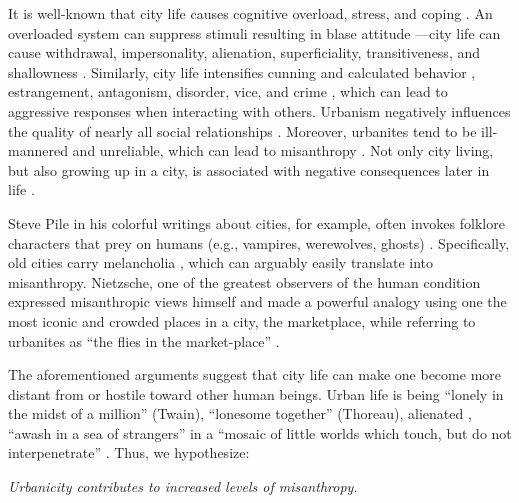\documentclass[11pt, letterpaper]{article}
\begin{document}
\begin{spacing}{1.4}
It is well-known that city life causes cognitive overload, stress, and coping \citep{simmel03, milgram70,lederbogen11}. An overloaded system can suppress stimuli resulting in blase attitude
\citep{simmel03}---city life can cause withdrawal, impersonality, alienation, superficiality, transitiveness, and shallowness \citep{wirth38}. Similarly, city life intensifies cunning and calculated behavior \citep{tonnies57}, estrangement, antagonism, disorder, vice, and crime
\citep{milgram70,park15,park84,bettencourt10b}, which can lead to aggressive
responses when interacting with others.
%
Urbanism negatively influences the quality of nearly all social relationships
\citep{wilson85}. Moreover, urbanites tend to be ill-mannered and unreliable,
which can lead to misanthropy
\citep[e.g.,][]{aokCityBook15,aok-sizeFetish17}. Not only city living, but also
growing up in a city, is associated with negative consequences later in life \citep{lederbogen11,aok20}.

Steve Pile in his colorful writings about cities, for example, often invokes
folklore characters that prey on humans (e.g., vampires, werewolves, ghosts)  \citep{pile05,pile05B,pile99}.
%
Specifically, old cities carry melancholia \citep{pile05B}, which can arguably easily translate into misanthropy.
%
Nietzsche, one of the greatest observers of the human condition expressed misanthropic views
himself \citep[e.g.,][]{avramenko2004zarathustra} %
 and made a powerful analogy using one the most iconic and crowded places in a city, the marketplace, while referring to urbanites as ``the flies in the market-place'' \citep{nietzsche05}. 

The aforementioned arguments suggest that city life can make one become more distant from or hostile toward other human beings. 
Urban life is being ``lonely in the midst of a million'' (Twain), ``lonesome together''
(Thoreau), alienated \citep{wirth38,nettler1957measure}, ``awash in a sea of strangers''
\citep[Merry cited in][p. 99]{wilson85} in a ``mosaic of little worlds which touch, but do not interpenetrate'' \citep[][p. 40]{park84}. Thus, we hypothesize:
 
{\indent\hspace{1in}\textit{Urbanicity contributes to increased levels of misanthropy.}}


\end{spacing}
\end{document}
